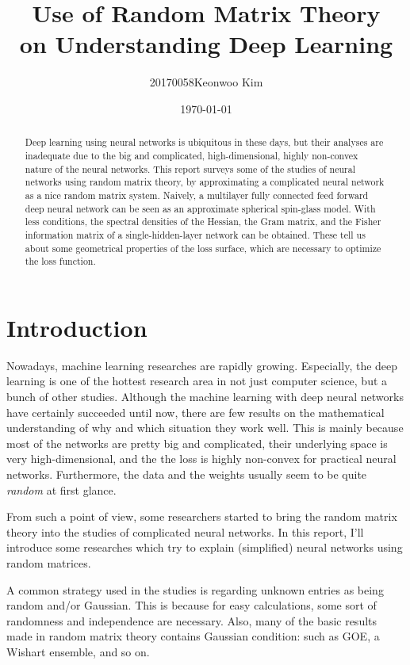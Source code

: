 \documentclass[notitlepage]{report}
\title{Use of Random Matrix Theory \\ on Understanding Deep Learning}
\author{20170058\quad Keonwoo Kim}
\date{\today}
\begin{document}
\renewcommand*\thesection{\arabic{section}}

\maketitle
\thispagestyle{empty}

\begin{abstract}
    Deep learning using neural networks is ubiquitous in these days, but their analyses are inadequate due to the big and complicated, high-dimensional, highly non-convex nature of the neural networks. This report surveys some of the studies of neural networks using random matrix theory, by approximating a complicated neural network as a nice random matrix system. Naively, a multilayer fully connected feed forward deep neural network can be seen as an approximate spherical spin-glass model. With less conditions, the spectral densities of the Hessian, the Gram matrix, and the Fisher information matrix of a single-hidden-layer network can be obtained. These tell us about some geometrical properties of the loss surface, which are necessary to optimize the loss function.  
\end{abstract}

\section{Introduction}

Nowadays, machine learning researches are rapidly growing. Especially, the deep learning is one of the hottest research area in not just computer science, but a bunch of other studies. Although the machine learning with deep neural networks have certainly succeeded until now, there are few results on the mathematical understanding of why and which situation they work well. This is mainly because most of the networks are pretty big and complicated, their underlying space is very high-dimensional, and the the loss is highly non-convex for practical neural networks. Furthermore, the data and the weights usually seem to be quite \emph{random} at first glance.

From such a point of view, some researchers started to bring the random matrix theory into the studies of complicated neural networks. In this report, I'll introduce some researches which try to explain (simplified) neural networks using random matrices.

A common strategy used in the studies is regarding unknown entries as being random and/or Gaussian. This is because for easy calculations, some sort of randomness and independence are necessary. Also, many of the basic results made in random matrix theory contains Gaussian condition: such as GOE, a Wishart ensemble, and so on.
\end{document}
